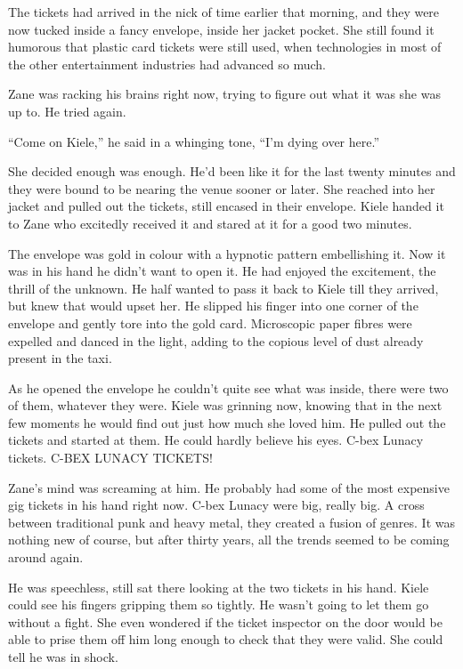 The tickets had arrived in the nick of time earlier that morning, and they were now tucked inside a fancy envelope, inside her jacket pocket.  She still found it humorous that plastic card tickets were still used, when technologies in most of the other entertainment industries had advanced so much.  

Zane was racking his brains right now, trying to figure out what it was she was up to.  He tried again.

``Come on Kiele,'' he said in a whinging tone, ``I'm dying over here.''

She decided enough was enough.  He'd been like it for the last twenty minutes and they were bound to be nearing the venue sooner or later.  She reached into her jacket and pulled out the tickets, still encased in their envelope.  Kiele handed it to Zane who excitedly received it and stared at it for a good two minutes.

The envelope was gold in colour with a hypnotic pattern embellishing it.  Now it was in his hand he didn't want to open it.  He had enjoyed the excitement, the thrill of the unknown.  He half wanted to pass it back to Kiele till they arrived, but knew that would upset her.  He slipped his finger into one corner of the envelope and gently tore into the gold card.  Microscopic paper fibres were expelled and danced in the light, adding to the copious level of dust already present in the taxi.

As he opened the envelope he couldn't quite see what was inside, there were two of them, whatever they were.  Kiele was grinning now, knowing that in the next few moments he would find out just how much she loved him.  He pulled out the tickets and started at them.  He could hardly believe his eyes.  C-bex Lunacy tickets.  C-BEX LUNACY TICKETS!

Zane's mind was screaming at him.  He probably had some of the most expensive gig tickets in his hand right now.  C-bex Lunacy were big, really big.  A cross between traditional punk and heavy metal, they created a fusion of genres.  It was nothing new of course, but after thirty years, all the trends seemed to be coming around again.

He was speechless, still sat there looking at the two tickets in his hand.  Kiele could see his fingers gripping them so tightly.  He wasn't going to let them go without a fight.  She even wondered if the ticket inspector on the door would be able to prise them off him long enough to check that they were valid.  She could tell he was in shock.

